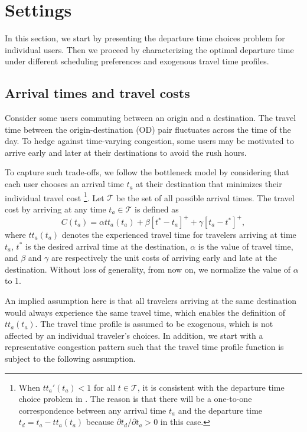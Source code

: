 \section{Settings}
In this section, we start by presenting the departure time choices problem for individual users. Then we proceed by characterizing the optimal departure time under different scheduling preferences and exogenous travel time profiles.


\subsection{Arrival times and travel costs}
\label{sec:cost_fn}

\label{sec:theory}

Consider some users commuting between an origin and a destination. The travel time between the origin-destination (OD) pair fluctuates across the time of the day. To hedge against time-varying congestion, some users may be motivated to arrive early and later at their destinations to avoid the rush hours.



To capture such trade-offs, we follow the bottleneck model by considering that each user chooses an arrival time $t_a$ at their destination that minimizes their individual travel cost  \footnote{When $tt_a'(t_a) < 1$ for all $t \in \mathcal{T}$, it is consistent with the departure time choice problem in \cite{arnott1993structural}. The reason is that there will be a one-to-one correspondence between any arrival time $t_a$ and the departure time $t_d = t_a - tt_a(t_a)$ because $\partial t_d/\partial t_a > 0$ in this case. }. Let $\mathcal{T}$ be the set of all possible arrival times. The travel cost by arriving at any time $t_a 
 \in \mathcal{T}$ is defined as 
\begin{equation}
  \label{eq:cost_ta}
  C(t_a) = \alpha tt_a(t_a) + \beta[t^*-t_a]^+ + \gamma[t_a-t^*]^+,
\end{equation}
where $tt_a(t_a)$ denotes the experienced travel time for travelers arriving at time $t_a$, \(t^*\) is the desired arrival time at the destination,  \(\alpha\) is the value of travel time, and \(\beta\) and \(\gamma\) are respectively the unit costs of arriving early and late at the destination. Without loss of generality, from now on, we normalize the value of $\alpha$ to 1.


 An implied assumption here is that all travelers arriving at the same destination would always experience the same travel time, which enables the definition of $tt_a(t_a)$. The travel time profile is assumed to be exogenous, which is not affected by an individual traveler's choices.  In addition, we start with a representative congestion pattern such that the travel time profile function is subject to the following assumption. 

